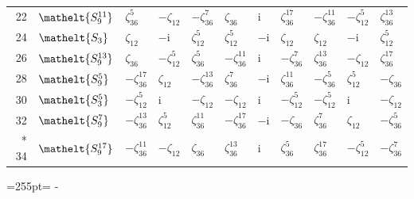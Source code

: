 \documentclass[10pt,a4paper]{article}
\newcommand{\needspace}[1]{\par\penalty-100\begingroup\dimen0=#1\relax\dimen2=\pagegoal
  \advance\dimen2-\pagetotal\ifdim\dimen0>\dimen2\relax\ifdim\dimen2>0pt\vfil\break\fi\fi
  \endgroup}
\numberwithin{equation}{section}
\newcommand{\eltfont}[1]{{\let\sigma\eltsigma\mathelt{#1}}}
\newcommand{\cls}[1]{\eltfont{#1}}
\newcommand{\iunit}{\mathrm{i}}
\newcommand{\rootunity}[1]{\zeta_{#1}}
\begin{document}
{\begin{longtable}{@{}rllllllllll@{}}
22 & $\cls{S_{9}^{11}}$ & $\rootunity{36}^{5}$ & $-\rootunity{12}$ & $-\rootunity{36}^{7}$ & $\rootunity{36}$ & $\iunit{}$ & $\rootunity{36}^{17}$ & $-\rootunity{36}^{11}$ & $-\rootunity{12}^{5}$ & $\rootunity{36}^{13}$\\
24 & $\cls{S_{3}}$ & $\rootunity{12}$ & $-\iunit{}$ & $\rootunity{12}^{5}$ & $\rootunity{12}^{5}$ & $-\iunit{}$ & $\rootunity{12}$ & $\rootunity{12}$ & $-\iunit{}$ & $\rootunity{12}^{5}$\\
26 & $\cls{S_{9}^{13}}$ & $\rootunity{36}$ & $-\rootunity{12}^{5}$ & $\rootunity{36}^{5}$ & $-\rootunity{36}^{11}$ & $\iunit{}$ & $-\rootunity{36}^{7}$ & $\rootunity{36}^{13}$ & $-\rootunity{12}$ & $\rootunity{36}^{17}$\\
28 & $\cls{S_{9}^{5}}$ & $-\rootunity{36}^{17}$ & $\rootunity{12}$ & $-\rootunity{36}^{13}$ & $\rootunity{36}^{7}$ & $-\iunit{}$ & $\rootunity{36}^{11}$ & $-\rootunity{36}^{5}$ & $\rootunity{12}^{5}$ & $-\rootunity{36}$\\
30 & $\cls{S_{3}^{5}}$ & $-\rootunity{12}^{5}$ & $\iunit{}$ & $-\rootunity{12}$ & $-\rootunity{12}$ & $\iunit{}$ & $-\rootunity{12}^{5}$ & $-\rootunity{12}^{5}$ & $\iunit{}$ & $-\rootunity{12}$\\
32 & $\cls{S_{9}^{7}}$ & $-\rootunity{36}^{13}$ & $\rootunity{12}^{5}$ & $\rootunity{36}^{11}$ & $-\rootunity{36}^{17}$ & $-\iunit{}$ & $-\rootunity{36}$ & $\rootunity{36}^{7}$ & $\rootunity{12}$ & $-\rootunity{36}^{5}$\\*
34 & $\cls{S_{9}^{17}}$ & $-\rootunity{36}^{11}$ & $-\rootunity{12}$ & $\rootunity{36}$ & $\rootunity{36}^{13}$ & $\iunit{}$ & $\rootunity{36}^{5}$ & $\rootunity{36}^{17}$ & $-\rootunity{12}^{5}$ & $-\rootunity{36}^{7}$\\
\bottomrule\end{longtable}}
\needspace{255pt}
\end{document}
